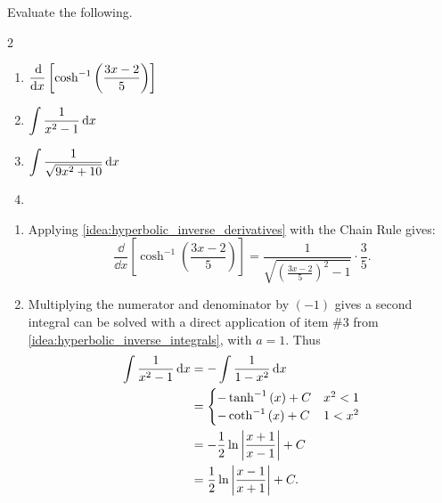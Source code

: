 \begin{example}\label{ex_hf3}%
Evaluate the following.
\begin{multicols}{2}
\begin{enumerate}
\item	$\displaystyle \frac{\operatorname{d}\!}{\operatorname{d}\! x}\left[\cosh^{-1}\left(\frac{3x-2}{5}\right)\right]$
\item	$\displaystyle \int\frac{1}{x^2-1}\operatorname{d}\! x$
\item	$\displaystyle \int \frac{1}{\sqrt{9x^2+10}}\operatorname{d}\! x$
\item[]
\end{enumerate}
\end{multicols}
\solution
\begin{enumerate}
\item	Applying \autoref{idea:hyperbolic_inverse_derivatives} with the Chain Rule gives:
		\[\frac{\dd}{\dd x}\left[\cosh^{-1}\left(\frac{3x-2}5\right)\right] = \frac{1}{\sqrt{\left(\frac{3x-2}5\right)^2-1}}\cdot\frac35.\]

\item		Multiplying the numerator and denominator by $(-1)$ gives 
a %
second integral can be solved with a direct application of item \#3 from \autoref{idea:hyperbolic_inverse_integrals}, with $a=1$. Thus
\begin{align}
\int \frac{1}{x^2-1}\operatorname{d}\! x &= -\int \frac{1}{1-x^2}\operatorname{d}\! x \notag \\
		&= \begin{cases}-\tanh^{-1}\left(x\right)+C & x^2<1 \\
-\coth^{-1}\left(x\right)+C & 1<x^2 \end{cases} \notag\\
     &=-\frac12\ln\left\lvert \frac{x+1}{x-1} \right\rvert+C\notag\\
     &=\frac12\ln\left\lvert \frac{x-1}{x+1} \right\rvert+C.\label{eq:hf3}
     \end{align}



\end{enumerate}
\end{example}
